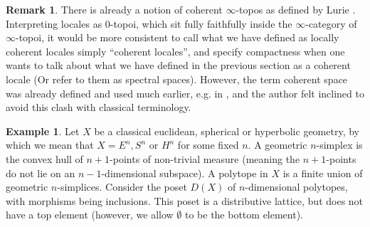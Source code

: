 \documentclass[10pt]{amsart}
\theoremstyle{definition}
\newtheorem{remark}[theorem]{Remark}
\newtheorem{example}[theorem]{Example}
\begin{document}
\begin{remark}
There is already a notion of coherent $\infty$-topos as defined by Lurie \cite[Definition A.2.0.12.]{lurieSAG}. Interpreting locales as $0$-topoi, which sit fully faithfully inside the $\infty$-category of $\infty$-topoi, it would be more consistent to call what we have defined as locally coherent locales simply ``coherent locales'', and specify compactness when one wants to talk about what we have defined in the previous section as a coherent locale (Or refer to them as spectral spaces). However, the term coherent space was already defined and used much earlier, e.g. in \cite{johnstone1982stone}, and the author felt inclined to avoid this clash with classical terminology.
\end{remark}



\begin{example} \label{polytopelattice}
Let $X$ be a classical euclidean, spherical or hyperbolic geometry, by which we mean that $X = E^n, S^n$ or $H^n$ for some fixed $n$. A geometric $n$-simplex is the convex hull of $n+1$-points of non-trivial measure (meaning the $n+1$-points do not lie on an $n-1$-dimensional subspace). A polytope in $X$ is a finite union of geometric $n$-simplices. Consider the poset $D(X)$ of $n$-dimensional polytopes, with morphisms being inclusions. This poset is a distributive lattice, but does not have a top element (however, we allow $\emptyset$ to be the bottom element).
\end{example}
\end{document}
